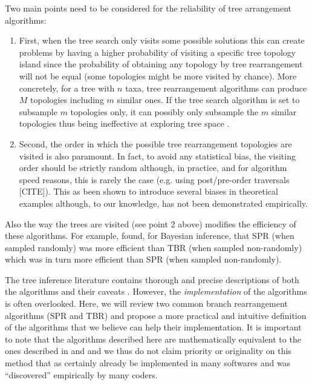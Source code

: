 \documentclass[12pt,letterpaper]{article}
\begin{document}
Two main points need to be considered for the reliability of tree arrangement algorithms:
\begin{enumerate}
    \item First, when the tree search only visits some possible solutions this can create problems by having a higher probability of visiting a specific tree topology island since the probability of obtaining any topology by tree rearrangement will not be equal (some topologies might be more visited by chance).
    More concretely, for a tree with $n$ taxa, tree rearrangement algorithms can produce $M$ topologies including $m$ similar ones.
    If the tree search algorithm is set to subsample $m$ topologies only, it can possibly only subsample the $m$ similar topologies thus being ineffective at exploring tree space \citep{allen2001subtree}.
    \item Second, the order in which the possible tree rearrangement topologies are visited is also paramount.
    In fact, to avoid any statistical bias, the visiting order should be strictly random \citep{goloboff2014bias} although, in practice, and for algorithm speed reasons, this is rarely the case (e.g. using post/pre-order traversals [CITE]).
    This as been shown to introduce several biases in theoretical examples \citep{goloboff2014bias} although, to our knowledge, has not been demonstrated empirically.
\end{enumerate}

Also the way the trees are visited (see point 2 above) modifies the efficiency of these algorithms.
For example, \cite{lakner2008efficiency} found, for Bayesian inference, that SPR (when sampled randomly) was more efficient than TBR (when sampled non-randomly) which was in turn more efficient than SPR (when sampled non-randomly).

The tree inference literature contains thorough and precise descriptions of both the algorithms \citep[e.g.][]{allen2001subtree,felsenstein2004inferring} and their caveats \citep[i.e speed and reliability - e.g.][]{morrison2007increasing,lakner2008efficiency,goloboff2014bias}.
However, the \textit{implementation} of the algorithms is often overlooked.
Here, we will review two common branch rearrangement algorithms (SPR and TBR) and propose a more practical and intuitive definition of the algorithms that we believe can help their implementation.
It is important to note that the algorithms described here are mathematically equivalent to the ones described in \cite{allen2001subtree} and \cite{felsenstein2004inferring} and we thus do not claim priority or originality on this method that as certainly already be implemented in many softwares and was ``discovered'' empirically by many coders.
\end{document}
